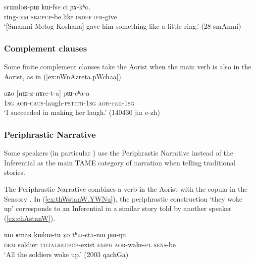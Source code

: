 \begin{exe}
\ex \label{ex:kWfse.ci.YAkho}
\gll srɯnloʁ-pɯ kɯ-fse ci ɲɤ-kʰo. \\
 ring-\textsc{dim} \textsc{sbj}:\textsc{pcp}-be.like \textsc{indef} \textsc{ifr}-give \\
 \glt `[Smanmi Metog Koshana] gave him something like a little ring.' (28-smAnmi)  
\end{exe}

\subsubsection{Complement clauses }   \label{sec:aor.complement} 
 
Some finite complement clauses take the Aorist when the main verb is also in the Aorist, as in (\ref{ex:nWnAzreta.pWchaa}). 

 \begin{exe}
\ex \label{ex:nWnAzreta.pWchaa}
\gll aʑo [nɯ-z-nɤre-t-a] pɯ-cʰa-a \\
\textsc{1sg} \textsc{aor}-\textsc{caus}-laugh-\textsc{pst}:\textsc{tr}-\textsc{1sg} \textsc{aor}-can-\textsc{1sg} \\
\glt `I succeeded in making her laugh.' (140430 jin e-zh) 
\end{exe}
 
\subsubsection{Periphrastic Narrative }   \label{sec:aor.narrative}
Some speakers (in particular ) use the Periphrastic Narrative instead of the Inferential as the main TAME category of narration when telling traditional stories.

The Periphrastic Narrative combines a verb in the Aorist with the copula in the Sensory . In (\ref{ex:thWstanW.YWNu}), the periphrastic construction  `they woke up' corresponds to an Inferential  in a similar story told by another speaker (\ref{ex:chAstanW}).

\begin{exe}
\ex \label{ex:thWstanW.YWNu}
\gll  nɯ ʁmaʁ kɯ\redp{}kɯ-tu ʑo tʰɯ-sta-nɯ ɲɯ-ŋu. \\
\textsc{dem} soldier \textsc{total}\redp{}\textsc{sbj}:\textsc{pcp}-exist \textsc{emph} \textsc{aor}-wake-\textsc{pl} \textsc{sens}-be \\
\glt `All the soldiers woke up.' (2003 qachGa)
\end{exe}

